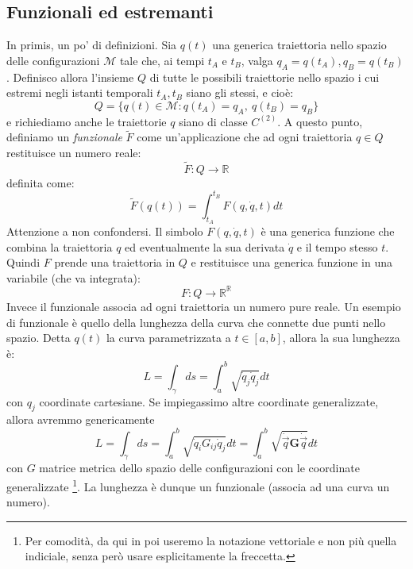 \documentclass[a4paper,openany]{article}
\begin{document}
	\subsection{Funzionali ed estremanti}
	In primis, un po' di definizioni. Sia $q(t)$ una generica traiettoria nello spazio delle configurazioni $\mathcal{M}$ tale che, ai tempi $t_A \mbox{ e } t_B$, valga $q_A = q(t_A), q_B = q(t_B)$. Definisco allora l'insieme $Q$ di tutte le possibili traiettorie nello spazio i cui estremi negli istanti temporali $t_A, t_B$ siano gli stessi, e cioè:
	\begin{equation}
		Q = \{q(t)\in \mathcal{M}: q(t_A) = q_A, \> q(t_B) = q_B\}
	\end{equation}
	e richiediamo anche le traiettorie $q$ siano di classe $C^{(2)}$. A questo punto, definiamo un \textit{funzionale} $\tilde{F}$ come un'applicazione che ad ogni traiettoria $q \in Q$ restituisce un numero reale:
	$$
	\tilde{F} : Q \rightarrow \mathbb{R}
	$$
	definita come:
	$$
	\tilde{F}(q(t)) = \int_{t_A}^{t_B}F(q,\dot{q},t) dt
	$$
	Attenzione a non confondersi. Il simbolo $F(q,\dot{q},t)$ è una generica funzione che combina la traiettoria $q$ ed eventualmente la sua derivata $\dot{q}$ e il tempo stesso $t$. Quindi $F$ prende una traiettoria in $Q$ e restituisce una generica funzione in una variabile (che va integrata):
	$$
	F : Q \rightarrow \mathbb{R}^{\mathbb{R}}
	$$
	Invece il funzionale associa ad ogni traiettoria un numero pure reale. Un esempio di funzionale è quello della lunghezza della curva che connette due punti nello spazio. Detta $q(t)$ la curva parametrizzata a $t\in[a,b]$, allora la sua lunghezza è:
	$$
	L = \int_{\gamma}ds = \int_{a}^{b}\sqrt{\dot{q}_j \dot{q}_j}dt
	$$
	con $q_j$ coordinate cartesiane. Se impiegassimo altre coordinate generalizzate, allora avremmo genericamente
	$$
	L = \int_{\gamma}ds = \int_{a}^{b}\sqrt{\dot{q}_i G_{ij}\dot{q}_j}dt = \int_{a}^{b}\sqrt{\dot{\vec{q}} \textbf{G}\dot{\vec{q}}}dt
	$$
	con $G$ matrice metrica dello spazio delle configurazioni con le coordinate generalizzate \footnote{Per comodità, da qui in poi useremo la notazione vettoriale e non più quella indiciale, senza però usare esplicitamente la freccetta.}. La lunghezza è dunque un funzionale (associa ad una curva un numero). 
	
\end{document}
